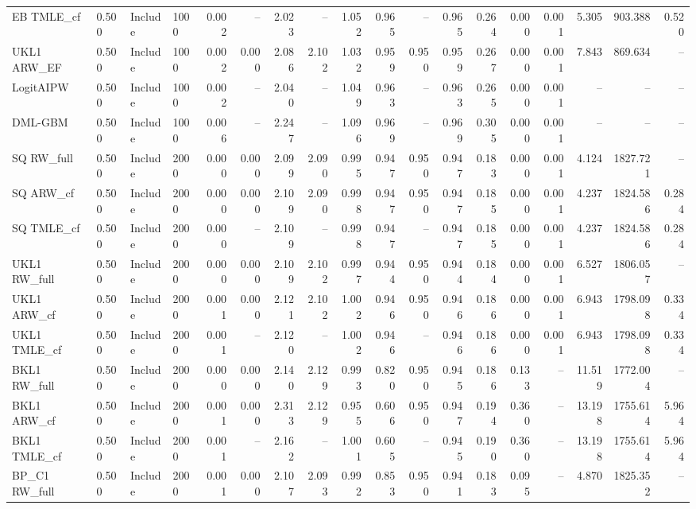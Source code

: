 \begin{tabular}{llllrrrrrrrrrrrrrr}
EB TMLE\_cf & 0.500 & Include & 1000 & 0.002 & -- & 2.023 & -- & 1.052 & 0.965 & -- & 0.965 & 0.264 & 0.000 & 0.001 & 5.305 & 903.388 & 0.520 \\
UKL1 ARW\_EF & 0.500 & Include & 1000 & 0.002 & 0.000 & 2.086 & 2.102 & 1.032 & 0.959 & 0.950 & 0.959 & 0.267 & 0.000 & 0.001 & 7.843 & 869.634 & -- \\
LogitAIPW & 0.500 & Include & 1000 & 0.002 & -- & 2.040 & -- & 1.049 & 0.963 & -- & 0.963 & 0.265 & 0.000 & 0.001 & -- & -- & -- \\
DML-GBM & 0.500 & Include & 1000 & 0.006 & -- & 2.247 & -- & 1.096 & 0.969 & -- & 0.969 & 0.305 & 0.000 & 0.001 & -- & -- & -- \\
SQ RW\_full & 0.500 & Include & 2000 & 0.000 & 0.000 & 2.099 & 2.090 & 0.995 & 0.947 & 0.950 & 0.947 & 0.183 & 0.000 & 0.001 & 4.124 & 1827.721 & -- \\
SQ ARW\_cf & 0.500 & Include & 2000 & 0.000 & 0.000 & 2.109 & 2.090 & 0.998 & 0.947 & 0.950 & 0.947 & 0.185 & 0.000 & 0.001 & 4.237 & 1824.586 & 0.284 \\
SQ TMLE\_cf & 0.500 & Include & 2000 & 0.000 & -- & 2.109 & -- & 0.998 & 0.947 & -- & 0.947 & 0.185 & 0.000 & 0.001 & 4.237 & 1824.586 & 0.284 \\
UKL1 RW\_full & 0.500 & Include & 2000 & 0.000 & 0.000 & 2.109 & 2.102 & 0.997 & 0.944 & 0.950 & 0.944 & 0.184 & 0.000 & 0.001 & 6.527 & 1806.057 & -- \\
UKL1 ARW\_cf & 0.500 & Include & 2000 & 0.001 & 0.000 & 2.121 & 2.102 & 1.002 & 0.946 & 0.950 & 0.946 & 0.186 & 0.000 & 0.001 & 6.943 & 1798.098 & 0.334 \\
UKL1 TMLE\_cf & 0.500 & Include & 2000 & 0.001 & -- & 2.120 & -- & 1.002 & 0.946 & -- & 0.946 & 0.186 & 0.000 & 0.001 & 6.943 & 1798.098 & 0.334 \\
BKL1 RW\_full & 0.500 & Include & 2000 & 0.000 & 0.000 & 2.140 & 2.129 & 0.993 & 0.820 & 0.950 & 0.945 & 0.186 & 0.133 & -- & 11.519 & 1772.004 & -- \\
BKL1 ARW\_cf & 0.500 & Include & 2000 & 0.001 & 0.000 & 2.313 & 2.129 & 0.955 & 0.606 & 0.950 & 0.947 & 0.194 & 0.360 & -- & 13.198 & 1755.614 & 5.964 \\
BKL1 TMLE\_cf & 0.500 & Include & 2000 & 0.001 & -- & 2.162 & -- & 1.001 & 0.605 & -- & 0.945 & 0.190 & 0.360 & -- & 13.198 & 1755.614 & 5.964 \\
BP\_C1 RW\_full & 0.500 & Include & 2000 & 0.001 & 0.000 & 2.107 & 2.093 & 0.992 & 0.853 & 0.950 & 0.941 & 0.183 & 0.095 & -- & 4.870 & 1825.352 & -- \\

\end{tabular}
